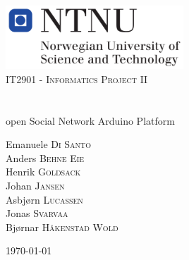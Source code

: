 \begin{titlepage}
	\begin{center}
		\includegraphics[width=0.5\textwidth]{img/NTNU-logo.png}\\[1cm]    
		\textsc{\Large IT2901 - Informatics Project II}\\[0.5cm]
		\HRule \\[0.6cm]
		{ \huge \bfseries \project}\\[0.4cm]
		open Social Network Arduino Platform
		\HRule \\[1.5cm]
		\begin{center} \large
			Emanuele \textsc{Di Santo} \\
			Anders \textsc{Behne Eie} \\
			Henrik \textsc{Goldsack} \\
			Johan \textsc{Jansen} \\
			Asbjørn \textsc{Lucassen} \\
			Jonas \textsc{Svarvaa} \\
			Bjørnar \textsc{Håkenstad Wold}
		\end{center}
		\vfill
		{\large \today}
	\end{center}
\end{titlepage}
